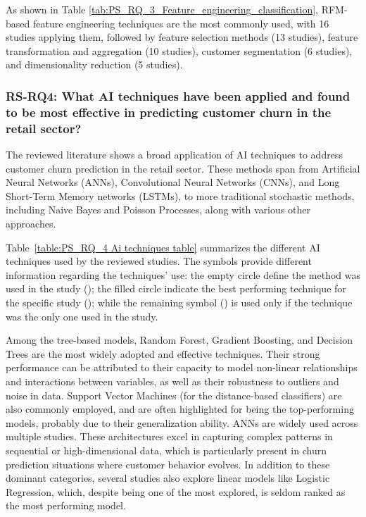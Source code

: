\documentclass[preprint,12pt]{elsarticle}
\newcommand{\RSRQfour}{RS-RQ4: What AI techniques have been applied and found to be most effective in predicting customer churn in the retail sector?}
\begin{document}
As shown in Table \ref{tab:PS_RQ_3_Feature_engineering_classification}, RFM-based feature engineering techniques are the most commonly used, with 16 studies applying them, followed by feature selection methods (13 studies), feature transformation and aggregation (10 studies), customer segmentation (6 studies), and dimensionality reduction  (5 studies).

\subsubsection{\RSRQfour}
The reviewed literature shows a broad application of AI techniques to address customer churn prediction in the retail sector. These methods span from Artificial Neural Networks (ANNs), Convolutional Neural Networks (CNNs), and Long Short-Term Memory networks (LSTMs), to more traditional stochastic methods, including Naive Bayes and Poisson Processes, along with various other approaches.

Table~\ref{table:PS_RQ_4 Ai techniques table} summarizes the different AI techniques used by the reviewed studies. The symbols provide different information regarding the techniques' use: the empty circle define the method was used in the study (\scalebox{0.9}{\textopenbullet}); the filled circle indicate the best performing technique for the specific study (\scalebox{0.9}{\textbullet}); while the remaining symbol (\scalebox{0.6}{$\blacksquare$}) is used only if the technique was the only one used in the study.

Among the tree-based models, Random Forest, Gradient Boosting, and Decision Trees are the most widely adopted and effective techniques. Their strong performance can be attributed to their capacity to model non-linear relationships and interactions between variables, as well as their robustness to outliers and noise in data. Support Vector Machines (for the distance-based classifiers) are also commonly employed, and are often highlighted for being the top-performing models, probably due to their generalization ability. ANNs are widely used across multiple studies. These architectures excel in capturing complex patterns in sequential or high-dimensional data, which is particularly present in churn prediction situations where customer behavior evolves. In addition to these dominant categories, several studies also explore linear models like Logistic Regression, which, despite being one of the most explored, is seldom ranked as the most performing model.
\end{document}
